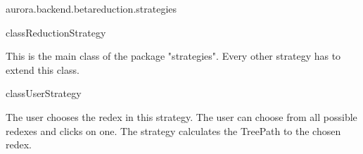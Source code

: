 \begin{texdocpackage}{aurora.backend.betareduction.strategies}
\begin{texdocclass}{class}{ReductionStrategy}
\label{texdoclet:aurora.backend.betareduction.strategies.ReductionStrategy}
\begin{texdocclassintro}
This is the main class of the package "strategies". Every other strategy has to extend this class.\end{texdocclassintro}
\begin{texdocclassconstructors}
\end{texdocclassconstructors}
\begin{texdocclassmethods}
\end{texdocclassmethods}
\end{texdocclass}


\begin{texdocclass}{class}{UserStrategy}
\label{texdoclet:aurora.backend.betareduction.strategies.UserStrategy}
\begin{texdocclassintro}
The user chooses the redex in this strategy.
 The user can choose from all possible redexes and clicks on one.
 The strategy calculates the TreePath to the chosen redex.\end{texdocclassintro}
\begin{texdocclassconstructors}
\end{texdocclassconstructors}
\begin{texdocclassmethods}
\end{texdocclassmethods}
\end{texdocclass}


\end{texdocpackage}



